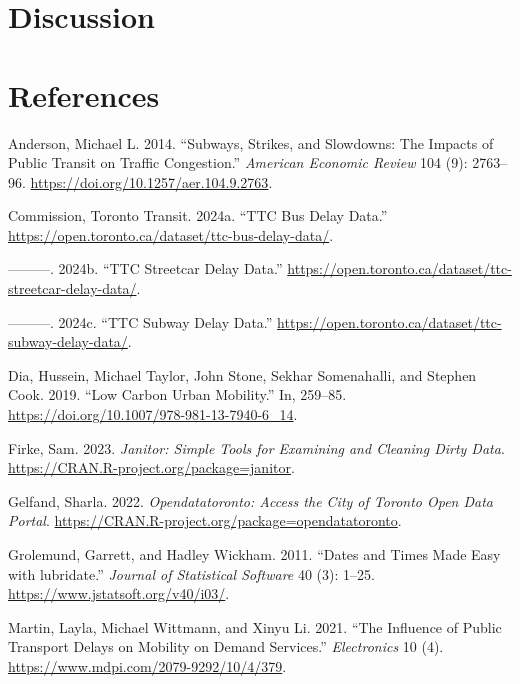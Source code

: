 \documentclass[
  letterpaper,
  DIV=11,
  numbers=noendperiod]{scrartcl}
\newlength{\cslhangindent}
\newenvironment{CSLReferences}[2] %
 {\begin{list}{}{%
  \setlength{\itemindent}{0pt}
  \setlength{\leftmargin}{0pt}
  \setlength{\parsep}{0pt}
  \ifodd #1
   \setlength{\leftmargin}{\cslhangindent}
   \setlength{\itemindent}{-1\cslhangindent}
  \fi
  \setlength{\itemsep}{#2\baselineskip}}}
 {\end{list}}
\begin{document}
\section{Discussion}\label{sec-discussion}

\section*{References}\label{references}

\label{refs}
\begin{CSLReferences}{1}{0}
Anderson, Michael L. 2014. {``Subways, Strikes, and Slowdowns: The
Impacts of Public Transit on Traffic Congestion.''} \emph{American
Economic Review} 104 (9): 2763--96.
\url{https://doi.org/10.1257/aer.104.9.2763}.

Commission, Toronto Transit. 2024a. {``TTC Bus Delay Data.''}
\url{https://open.toronto.ca/dataset/ttc-bus-delay-data/}.

---------. 2024b. {``TTC Streetcar Delay Data.''}
\url{https://open.toronto.ca/dataset/ttc-streetcar-delay-data/}.

---------. 2024c. {``TTC Subway Delay Data.''}
\url{https://open.toronto.ca/dataset/ttc-subway-delay-data/}.

Dia, Hussein, Michael Taylor, John Stone, Sekhar Somenahalli, and
Stephen Cook. 2019. {``Low Carbon Urban Mobility.''} In, 259--85.
\url{https://doi.org/10.1007/978-981-13-7940-6_14}.

Firke, Sam. 2023. \emph{Janitor: Simple Tools for Examining and Cleaning
Dirty Data}. \url{https://CRAN.R-project.org/package=janitor}.

Gelfand, Sharla. 2022. \emph{Opendatatoronto: Access the City of Toronto
Open Data Portal}.
\url{https://CRAN.R-project.org/package=opendatatoronto}.

Grolemund, Garrett, and Hadley Wickham. 2011. {``Dates and Times Made
Easy with {lubridate}.''} \emph{Journal of Statistical Software} 40 (3):
1--25. \url{https://www.jstatsoft.org/v40/i03/}.

Martin, Layla, Michael Wittmann, and Xinyu Li. 2021. {``The Influence of
Public Transport Delays on Mobility on Demand Services.''}
\emph{Electronics} 10 (4).
\url{https://www.mdpi.com/2079-9292/10/4/379}.


\end{CSLReferences}
\end{document}
